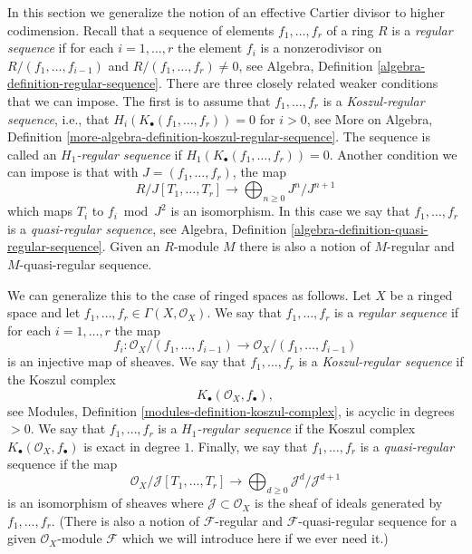 \noindent
In this section we generalize the notion of an effective Cartier divisor
to higher codimension. Recall that a sequence of elements
$f_1, \ldots, f_r$ of a ring $R$ is a {\it regular sequence} if for each
$i = 1, \ldots, r$ the element $f_i$ is a nonzerodivisor on
$R/(f_1, \ldots, f_{i - 1})$ and $R/(f_1, \dots, f_r) \not = 0$, see
Algebra, Definition \ref{algebra-definition-regular-sequence}.
There are three closely related weaker conditions that we can impose.
The first is to assume that $f_1, \ldots, f_r$ is a {\it Koszul-regular
sequence}, i.e., that $H_i(K_\bullet(f_1, \ldots, f_r)) = 0$ for $i > 0$, see
More on Algebra,
Definition \ref{more-algebra-definition-koszul-regular-sequence}.
The sequence is called an {\it $H_1$-regular sequence} if
$H_1(K_\bullet(f_1, \ldots, f_r)) = 0$. Another condition we can impose
is that with $J = (f_1, \ldots, f_r)$, the map
$$
R/J[T_1, \ldots, T_r]
\longrightarrow
\bigoplus\nolimits_{n \geq 0}
J^n/J^{n + 1}
$$
which maps $T_i$ to $f_i \bmod J^2$ is an isomorphism. In this case
we say that $f_1, \ldots, f_r$ is a
{\it quasi-regular sequence}, see
Algebra, Definition \ref{algebra-definition-quasi-regular-sequence}.
Given an $R$-module $M$ there is also a notion of $M$-regular and
$M$-quasi-regular sequence.

\medskip\noindent
We can generalize this to the case of ringed spaces as follows.
Let $X$ be a ringed space and let
$f_1, \ldots, f_r \in \Gamma(X, \mathcal{O}_X)$.
We say that $f_1, \ldots, f_r$ is a {\it regular sequence} if
for each $i = 1, \ldots, r$ the map
\begin{equation}
\label{equation-map-regular}
f_i :
\mathcal{O}_X/(f_1, \ldots, f_{i - 1})
\longrightarrow
\mathcal{O}_X/(f_1, \ldots, f_{i - 1})
\end{equation}
is an injective map of sheaves. We say that $f_1, \ldots, f_r$ is a
{\it Koszul-regular sequence} if the Koszul complex
\begin{equation}
\label{equation-koszul}
K_\bullet(\mathcal{O}_X, f_\bullet),
\end{equation}
see
Modules, Definition \ref{modules-definition-koszul-complex},
is acyclic in degrees $> 0$. We say that $f_1, \ldots, f_r$ is a
{\it $H_1$-regular sequence} if the Koszul complex
$K_\bullet(\mathcal{O}_X, f_\bullet)$ is exact in degree $1$. Finally,
we say that $f_1, \ldots, f_r$ is a
{\it quasi-regular} sequence if the map
\begin{equation}
\label{equation-map-quasi-regular}
\mathcal{O}_X/\mathcal{J}[T_1, \ldots, T_r]
\longrightarrow
\bigoplus\nolimits_{d \geq 0} \mathcal{J}^d/\mathcal{J}^{d + 1}
\end{equation}
is an isomorphism of sheaves where $\mathcal{J} \subset \mathcal{O}_X$
is the sheaf of ideals generated by $f_1, \ldots, f_r$. (There is also
a notion of $\mathcal{F}$-regular and $\mathcal{F}$-quasi-regular sequence
for a given $\mathcal{O}_X$-module $\mathcal{F}$ which we will introduce
here if we ever need it.)

